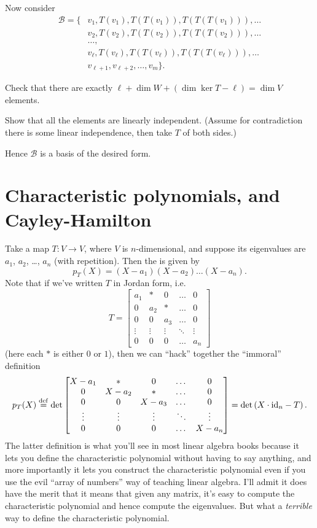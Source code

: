 Now consider
\begin{align*}
	\mathcal B =
	\Big\{ & v_1, T(v_1), T(T(v_1)), T(T(T(v_1))), \dots \\
	& v_2, T(v_2), T(T(v_2)), T(T(T(v_2))), \dots \\
	& \dots, \\
	& v_\ell, T(v_\ell), T(T(v_\ell)), T(T(T(v_\ell))), \dots \\
	& v_{\ell+1}, v_{\ell+2}, \dots, v_m \Big\}.
\end{align*}
\begin{ques}
Check that there are exactly $\ell + \dim W + (\dim \ker T - \ell) = \dim V$ elements.
\end{ques}
\begin{exercise}
	Show that all the elements are linearly independent.
	(Assume for contradiction there is some linear independence,
	then take $T$ of both sides.)
\end{exercise}
Hence $\mathcal B$ is a basis of the desired form.


\section{Characteristic polynomials, and Cayley-Hamilton}
Take a map $T : V \to V$, where $V$ is $n$-dimensional, and suppose its eigenvalues
are $a_1$, $a_2$, \dots, $a_n$ (with repetition).
Then the  is given by
\[
	p_T(X) = (X-a_1)(X-a_2) \dots (X-a_n).
\]
Note that if we've written $T$ in Jordan form, i.e.\ 
\[
	T = \begin{bmatrix}
		a_1 & \ast & 0 & \dots & 0 \\
		0 & a_2 & \ast & \dots & 0 \\
		0 & 0 & a_3 & \dots & 0 \\
		\vdots & \vdots & \vdots & \ddots & \vdots \\
		0 & 0 & 0 & \dots & a_n
	\end{bmatrix}
\]
(here each $\ast$ is either $0$ or $1$),
then we can ``hack'' together the ``immoral'' definition
\[
	p_T(X) \overset{\mathrm{def}}{=} \det \begin{bmatrix}
		X - a_1 & \ast & 0 & \dots & 0 \\
		0 & X - a_2 & \ast & \dots & 0 \\
		0 & 0 & X - a_3 & \dots & 0 \\
		\vdots & \vdots & \vdots & \ddots & \vdots \\
		0 & 0 & 0 & \dots & X - a_n
	\end{bmatrix}
	= \det \left( X \cdot \mathrm{id}_n - T \right).
\]
The latter definition is what you'll see in most linear algebra books because
it lets you define the characteristic polynomial without having to say anything,
and more importantly it lets you construct the characteristic polynomial
even if you use the evil ``array of numbers'' way of teaching linear algebra.
I'll admit it does have the merit that it means that given any matrix,
it's easy to compute the characteristic polynomial and hence
compute the eigenvalues.
But what a \emph{terrible} way to define the characteristic polynomial.

